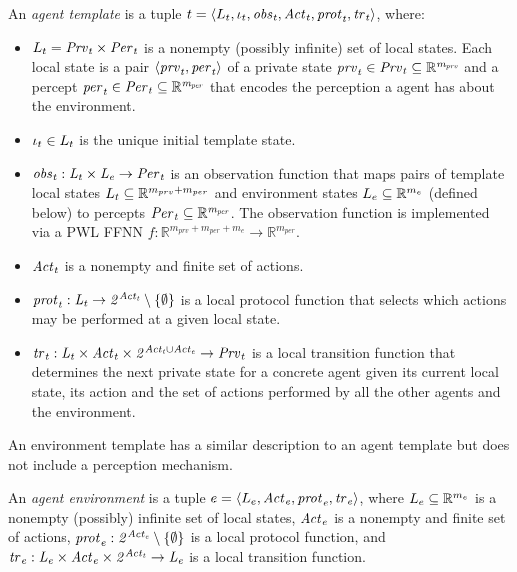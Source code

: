 \begin{definition}
An {\em agent template} is a tuple ${t} = \left \langle L_{t}, \iota_{t}, \it{obs}_{t},
\it{Act}_{t}, \it{prot}_{t}, \it{tr}_{t}  \right \rangle$, where:
\begin{itemize}
  \item $L_{t} = \it{Prv}_{t} \times \it{Per}_{t}$ is a nonempty (possibly infinite)
  set of local states.  Each local state  is a pair $\left \langle \it{prv}_{t}, \it{per}_{t} \right \rangle$ of
  a private state $\it{prv}_{t} \in \it{Prv}_{t} \subseteq \mathbb R^{m_{prv}}$ and a
  percept $\it{per}_{t} \in \it{Per}_{t} \subseteq \mathbb R^{m_{per}}$ that encodes the
  perception a agent has about the environment.  

  \item $\iota_{t} \in L_{t}$ is the unique initial template state.
  
  \item $\it{obs}_{t} : L_{t} \times L_{e} \rightarrow \it{Per}_{t}$ is an
  observation function that maps pairs of template local states $L_{t}
  \subseteq \mathbb{R}^{m_{prv} + m_{per}}$ and environment states $L_{e}
  \subseteq \mathbb{R}^{m_e}$ (defined below) to percepts $\it{Per}_{t} \subseteq
  \mathbb{R}^{m_{per}}$. The observation function is implemented via a PWL FFNN $f :
  \mathbb{R}^{m_{prv} + m_{per} + m_e} \rightarrow \mathbb{R}^{m_{per}}$.

  \item $\it{Act}_{t}$ is a nonempty and finite set of actions.
  
  \item $\it{prot}_{t} : L_{t} \rightarrow 2^{\it{Act}_{t}} \setminus \left \{ \emptyset \right \}$
  is a local protocol function that selects which actions may be performed at a
  given local state.

  \item $\it{tr}_{t}: L_{t} \times \it{Act}_{t} \times 2^{\it{Act}_{t} \cup \it{Act}_{e}}
  \rightarrow \it{Prv}_{t}$ is a local transition function  that determines the next
  private state for a concrete agent given its current local state, its action
  and the set of actions performed by all the other agents  and the environment.
  
\end{itemize}  
\end{definition}

An environment template has a similar description to an agent template but does
not include a perception mechanism.

\begin{definition}
An {\em agent environment} is a tuple ${e} = \left \langle L_{e}, \it{Act}_{e}, \it{prot}_{e}, \it{tr}_{e}  \right \rangle$, where $L_{e}  \subseteq \mathbb R^{m_e}$ is a nonempty
(possibly) infinite set of local states, $\it{Act}_{e}$ is a nonempty and finite set
of actions,  $\it{prot}_{e} : 2^{\it{Act}_{e}} \setminus \left \{ \emptyset \right \}$ is a local
protocol function, and $\it{tr}_{e} : L_{e} \times \it{Act}_{e} \times 2^{\it{Act}_{t}} 
\rightarrow L_{e}$ is a local transition function.
\end{definition}

